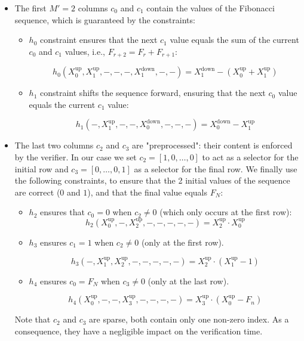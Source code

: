 \documentclass{article}
\begin{document}
\begin{itemize}
    \item The first $M' = 2$ columns $c_0$ and $c_1$ contain the values of the Fibonacci sequence, which is guaranteed by the constraints:

\begin{itemize}
    \item $h_0$ constraint ensures that the next $c_1$ value equals the sum of the current $c_0$ and $c_1$ values, i.e., $F_{r+2} = F_r + F_{r+1}$:
    
    $$h_0(X_0^{\text{up}}, X_1^{\text{up}}, -, -, -, X_1^{\text{down}}, -, -) = X_1^{\text{down}} - (X_0^{\text{up}} + X_1^{\text{up}})$$
    \item $h_1$ constraint shifts the sequence forward, ensuring that the next $c_0$ value equals the current $c_1$ value:
    
    $$h_1(-, X_1^{\text{up}}, -, -, X_0^{\text{down}}, -, -, -) = X_0^{\text{down}} - X_1^{\text{up}}$$
\end{itemize}

 \item The last two columns $c_2$ and $c_3$ are "preprocessed": their content is enforced by the verifier. In our case we set $c_2 = [1, 0, \dots, 0]$ to act as a selector for the initial row and $c_3 = [0, \dots, 0, 1]$ as a selector for the final row. We finally use the following constraints, to ensure that the 2 initial values of the sequence are correct ($0$ and $1$), and that the final value equals $F_N$:

 \begin{itemize}
    \item $h_2$ ensures that $c_0=0$ when $c_2 \neq 0$ (which only occurs at the first row):
    $$h_2(X_0^{\text{up}}, -, X_2^{\text{up}}, -, -, -, -, -) =   X_2^{\text{up}} \cdot X_0^{\text{up}}$$
    
    \item $h_3$ ensures $c_1 = 1$ when $c_2 \neq 0$ (only at the first row).
    
    $$h_3(-, X_1^{\text{up}}, X_2^{\text{up}}, -, -, -, -, -) =  X_2^{\text{up}} \cdot (X_1^{\text{up}} - 1) $$ 


 \item $h_4$ ensures $c_0 = F_N$ when $c_3 \neq 0$ (only at the last row).
 
 $$h_4(X_0^{\text{up}}, -, -, X_3^{\text{up}}, -, -, -, -) = X_3^{\text{up}} \cdot (X_0^{\text{up}} - F_n)$$ 


\end{itemize}

Note that $c_2$ and $c_3$ are sparse, both contain only one non-zero index. As a consequence, they have a negligible impact on the verification time.

 \end{itemize}
\end{document}
